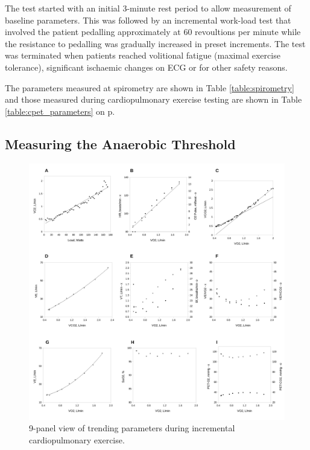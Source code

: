 The test started with an initial 3-minute rest period to allow measurement of baseline parameters. This was followed by an incremental work-load test that involved the patient pedalling approximately at 60 revoultions per minute while the resistance to pedalling was gradually increased in preset increments. The test was terminated when patients reached volitional fatigue (maximal exercise tolerance), significant ischaemic changes on ECG or for other safety reasons. 

The parameters measured at spirometry are shown in Table \ref{table:spirometry} and those measured during cardiopulmonary exercise testing are shown in Table \ref{table:cpet_parameters} on p\pageref{table:cpet_parameters}.

\subsection{Measuring the Anaerobic Threshold}

\begin{figure}[htbp]
	\centering
	\includegraphics[width=\textwidth]{Figures/cpet_9panel.pdf}
	\caption{9-panel view of trending parameters during incremental cardiopulmonary exercise.}
	\label{fig:cpet_9panel}
\end{figure}

